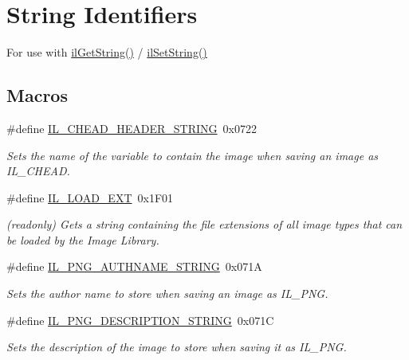 \hypertarget{group__il__strings}{\section{String Identifiers}
\label{group__il__strings}
}


For use with \hyperlink{group__state_ga29fd50e44b7e69435d64f82613438e4f}{il\+Get\+String()} / \hyperlink{group__state_ga9a4eb898282d4a5cdecc6303bca20814}{il\+Set\+String()}  


\subsection*{Macros}
\begin{DoxyCompactItemize}
\item 
\#define \hyperlink{group__il__strings_gac9085152fa2bb0125a76f30726d7f264}{I\+L\+\_\+\+C\+H\+E\+A\+D\+\_\+\+H\+E\+A\+D\+E\+R\+\_\+\+S\+T\+R\+I\+N\+G}~0x0722
\begin{DoxyCompactList}\small\item\em Sets the name of the variable to contain the image when saving an image as I\+L\+\_\+\+C\+H\+E\+A\+D. \end{DoxyCompactList}\item 
\#define \hyperlink{group__il__strings_ga09df47b32f4815700383b52dad81860b}{I\+L\+\_\+\+L\+O\+A\+D\+\_\+\+E\+X\+T}~0x1\+F01
\begin{DoxyCompactList}\small\item\em (readonly) Gets a string containing the file extensions of all image types that can be loaded by the Image Library. \end{DoxyCompactList}\item 
\#define \hyperlink{group__il__strings_ga1d99e48f9352580af6d4d546e4e22364}{I\+L\+\_\+\+P\+N\+G\+\_\+\+A\+U\+T\+H\+N\+A\+M\+E\+\_\+\+S\+T\+R\+I\+N\+G}~0x071\+A
\begin{DoxyCompactList}\small\item\em Sets the author name to store when saving an image as I\+L\+\_\+\+P\+N\+G. \end{DoxyCompactList}\item 
\#define \hyperlink{group__il__strings_ga99287df89538f6c9519ee58addb007b6}{I\+L\+\_\+\+P\+N\+G\+\_\+\+D\+E\+S\+C\+R\+I\+P\+T\+I\+O\+N\+\_\+\+S\+T\+R\+I\+N\+G}~0x071\+C
\begin{DoxyCompactList}\small\item\em Sets the description of the image to store when saving it as I\+L\+\_\+\+P\+N\+G. \end{DoxyCompactList}\item 

\end{DoxyCompactItemize}
